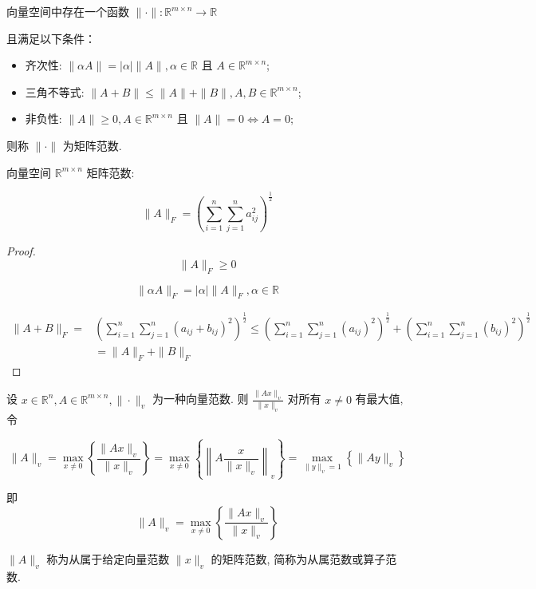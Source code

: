 \begin{definition}
    向量空间中存在一个函数 $ \|\cdot\|: \mathbb{R}^{m \times n} \rightarrow \mathbb{R} $

    且满足以下条件：

    \begin{itemize}
        \item 齐次性: $ \|\alpha A\|=|\alpha|\|A\|, \alpha \in \mathbb{R} $ 且 $ A \in \mathbb{R}^{m \times n} $;
        \item 三角不等式: $ \|A+B\| \leq\|A\|+\|B\|, A, B \in \mathbb{R}^{m \times n} $;
        \item 非负性: $ \|A\| \geq 0, A \in \mathbb{R}^{m \times n} $ 且 $ \|A\|=0 \Leftrightarrow A=0 $;
    \end{itemize}

则称 $ \|\cdot\| $ 为矩阵范数. 
\end{definition}

向量空间 $ \mathbb{R}^{m \times n} $ 矩阵范数:

\begin{example}
    $$ \|A\|_{F}=\left(\sum_{i=1}^{n} \sum_{j=1}^{n} a_{i j}^{2}\right)^{\frac{1}{2}} $$
\end{example}

\begin{proof}
    $$ \|A\|_{F} \geq 0 $$

    $$ \|\alpha A\|_{F}=|\alpha|\|A\|_{F}, \alpha \in \mathbb{R} $$

    $$ \begin{aligned}\|A+B\|_{F}=&\left(\sum_{i=1}^{n} \sum_{j=1}^{n}\left(a_{i j}+b_{i j}\right)^{2}\right)^{\frac{1}{2}} \leq\left(\sum_{i=1}^{n} \sum_{j=1}^{n}\left(a_{i j}\right)^{2}\right)^{\frac{1}{2}}+\left(\sum_{i=1}^{n} \sum_{j=1}^{n}\left(b_{i j}\right)^{2}\right)^{\frac{1}{2}} \\ &=\|A\|_{F}+\|B\|_{F} \end{aligned} $$
\end{proof}

\begin{definition}
    设 $ x \in \mathbb{R}^{n}, A \in \mathbb{R}^{m \times n},\|\cdot\|_{v} $ 为一种向量范数. 则 $ \frac{\|A x\|_{v}}{\|x\|_{v}} $ 对所有 $ x \neq 0 $ 有最大值, 令

    $$ \|A\|_{v}=\max _{x \neq 0}\left\{\frac{\|A x\|_{v}}{\|x\|_{v}}\right\}=\max _{x \neq 0}\left\{\left\|A \frac{x}{\|x\|_{v}}\right\|_{v}\right\}=\max _{\|y\|_{v}=1}\left\{\|A y\|_{v}\right\} $$

    即$$ \|A\|_{v}=\max _{x \neq 0}\left\{\frac{\|A x\|_{v}}{\|x\|_{v}}\right\} $$

    $ \|A\|_{v} $ 称为从属于给定向量范数 $ \|x\|_{v} $ 的矩阵范数, 简称为从属范数或算子范数.
\end{definition}

